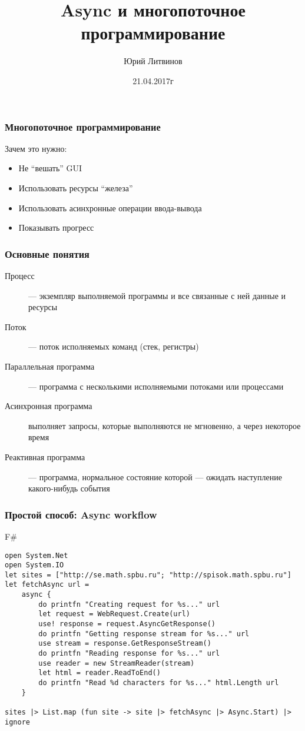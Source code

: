 \documentclass[xetex,mathserif,serif]{beamer}
\title{Async и многопоточное программирование}
\author{Юрий Литвинов}
\date{21.04.2017г}
\begin{document}
	
	\frame{\titlepage}

	\begin{frame}
		\frametitle{Многопоточное программирование}
		Зачем это нужно:
		\begin{itemize}
			\item Не ``вешать'' GUI
			\item Использовать ресурсы ``железа''
			\item Использовать асинхронные операции ввода-вывода
			\item Показывать прогресс
		\end{itemize}
	\end{frame}

	\begin{frame}
		\frametitle{Основные понятия}
		\begin{description}
			\item[Процесс] --- экземпляр выполняемой программы и все связанные с ней данные и ресурсы
			\item[Поток] --- поток исполняемых команд (стек, регистры)
			\item[Параллельная программа] --- программа с несколькими исполняемыми потоками или процессами
			\item[Асинхронная программа] выполняет запросы, которые выполняются не мгновенно, а через некоторое время
			\item[Реактивная программа] --- программа, нормальное состояние которой --- ожидать наступление какого-нибудь события
		\end{description}
	\end{frame}

	\begin{frame}[fragile]
		\frametitle{Простой способ: Async workflow}
		\begin{footnotesize}
			\begin{exampleblock}{F\#}
				\begin{verbatim}
open System.Net
open System.IO
let sites = ["http://se.math.spbu.ru"; "http://spisok.math.spbu.ru"]
let fetchAsync url =
    async { 
        do printfn "Creating request for %s..." url
        let request = WebRequest.Create(url)
        use! response = request.AsyncGetResponse()
        do printfn "Getting response stream for %s..." url
        use stream = response.GetResponseStream()
        do printfn "Reading response for %s..." url
        use reader = new StreamReader(stream)
        let html = reader.ReadToEnd()
        do printfn "Read %d characters for %s..." html.Length url 
    }

sites |> List.map (fun site -> site |> fetchAsync |> Async.Start) |> ignore
				\end{verbatim}
			\end{exampleblock}
		\end{footnotesize}
\end{frame}
\end{document}
